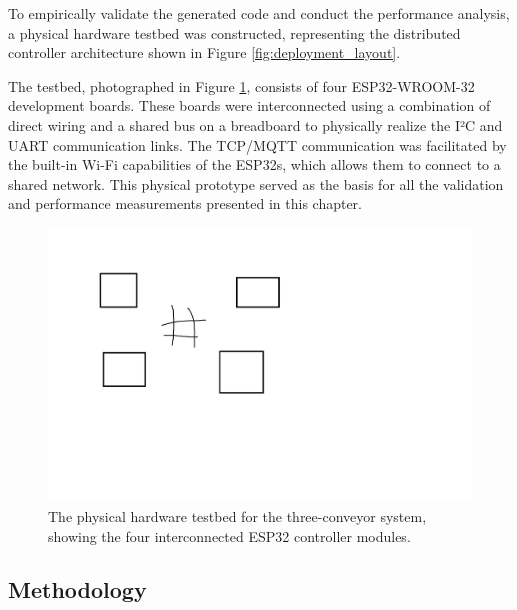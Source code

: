 To empirically validate the generated code and conduct the performance analysis, a physical hardware testbed was constructed, representing the distributed controller architecture shown in Figure \ref{fig:deployment_layout}. 

The testbed, photographed in Figure \ref{fig:hardware_photo}, consists of four ESP32-WROOM-32 development boards. These boards were interconnected using a combination of direct wiring and a shared bus on a breadboard to physically realize the I²C and UART communication links. The TCP/MQTT communication was facilitated by the built-in Wi-Fi capabilities of the ESP32s, which allows them to connect to a shared network. This physical prototype served as the basis for all the validation and performance measurements presented in this chapter.

\begin{figure}[htb!]
    \centering
    \includegraphics[width=0.9\columnwidth]{Chapters/Figures/photo_of_setup.png}
    \caption{The physical hardware testbed for the three-conveyor system, showing the four interconnected ESP32 controller modules.}
    \label{fig:hardware_photo}
\end{figure}

\subsection{Methodology}
\label{subsec:analysis_methodology}

